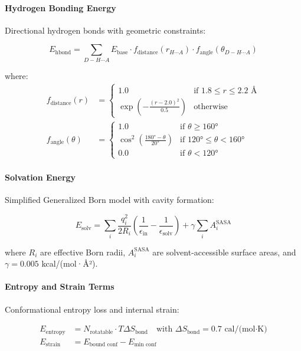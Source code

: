 \documentclass[11pt,a4paper]{article}
\begin{document}
\paragraph{Hydrogen Bonding Energy}
Directional hydrogen bonds with geometric constraints:

\begin{equation}
E_{\text{hbond}} = \sum_{D-H \cdots A} E_{\text{base}} \cdot f_{\text{distance}}(r_{H \cdots A}) \cdot f_{\text{angle}}(\theta_{D-H \cdots A})
\end{equation}

where:
\begin{align}
f_{\text{distance}}(r) &= \begin{cases}
1.0 & \text{if } 1.8 \leq r \leq 2.2 \text{ Å} \\
\exp\left(-\frac{(r-2.0)^2}{0.5}\right) & \text{otherwise}
\end{cases} \\
f_{\text{angle}}(\theta) &= \begin{cases}
1.0 & \text{if } \theta \geq 160° \\
\cos^2\left(\frac{180° - \theta}{20°}\right) & \text{if } 120° \leq \theta < 160° \\
0.0 & \text{if } \theta < 120°
\end{cases}
\end{align}

\paragraph{Solvation Energy}
Simplified Generalized Born model with cavity formation:

\begin{equation}
E_{\text{solv}} = \sum_{i} \frac{q_i^2}{2R_i}\left(\frac{1}{\epsilon_{\text{in}}} - \frac{1}{\epsilon_{\text{solv}}}\right) + \gamma \sum_{i} A_i^{\text{SASA}}
\end{equation}

where $R_i$ are effective Born radii, $A_i^{\text{SASA}}$ are solvent-accessible surface areas, and $\gamma = 0.005$ kcal/(mol·Å²).

\paragraph{Entropy and Strain Terms}
Conformational entropy loss and internal strain:

\begin{align}
E_{\text{entropy}} &= N_{\text{rotatable}} \cdot T\Delta S_{\text{bond}} \quad \text{with } \Delta S_{\text{bond}} = 0.7 \text{ cal/(mol·K)} \\
E_{\text{strain}} &= E_{\text{bound conf}} - E_{\text{min conf}}
\end{align}
\end{document}
